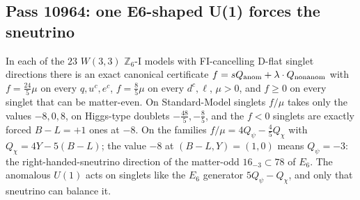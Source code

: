 \subsection{Pass 10964: one E6-shaped U(1) forces the sneutrino}

In each of the $23$ $W(3,3)$ $\mathbb{Z}_6$-I models with FI-cancelling D-flat singlet directions
there is an exact canonical certificate $f=sQ_{\rm anom}+\lambda\cdot Q_{\rm nonanom}$ with
$f=\tfrac{24}{5}\mu$ on every $q,u^c,e^c$, $f=\tfrac85\mu$ on every $d^c,\ell$, $\mu>0$, and
$f\ge0$ on every singlet that can be matter-even.  On Standard-Model singlets $f/\mu$ takes
only the values $-8,0,8$, on Higgs-type doublets $-\tfrac{48}{5},-\tfrac85$, and the $f<0$
singlets are exactly forced $B-L=+1$ ones at $-8$.  On the families
$f/\mu=4Q_\psi-\tfrac45Q_\chi$ with $Q_\chi=4Y-5(B-L)$; the value $-8$ at $(B-L,Y)=(1,0)$
means $Q_\psi=-3$: the right-handed-sneutrino direction of the matter-odd $16_{-3}\subset78$ of
$E_6$.  The anomalous $U(1)$ acts on singlets like the $E_6$ generator $5Q_\psi-Q_\chi$, and only
that sneutrino can balance it.
